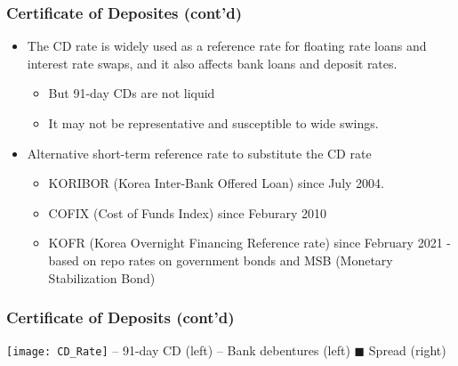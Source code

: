 \documentclass[10pt]{beamer}
\begin{document}
	\begin{frame}
		\frametitle{Certificate of Deposites (cont'd)}
		
		\begin{itemize}  \vspace{5pt} \itemsep10pt
			\item The CD rate is widely used as a reference rate for floating rate loans and interest rate swaps, and it also affects bank loans and deposit rates.
			\begin{itemize}  \vspace{5pt} \itemsep10pt
				\item But 91-day CDs are not liquid
				\item It may not be representative and susceptible to wide swings.
			\end{itemize}		
			
			\item Alternative short-term reference rate to substitute the CD rate
			\begin{itemize}  \vspace{5pt} \itemsep10pt
				\item KORIBOR (Korea Inter-Bank Offered Loan) since July 2004. 
				\item COFIX (Cost of Funds Index) since Feburary
				2010
				\item KOFR (Korea Overnight Financing Reference rate) since February 2021 - based on repo rates on government bonds and MSB (Monetary Stabilization Bond)
			\end{itemize} 	
		\end{itemize}		
		
		
	\end{frame}
	
	\begin{comment}
		\begin{frame}
			\frametitle{The LIBOR Scandals \scriptsize{pp. 34, BKM}} %
			\begin{center}
				\texttt{[image: LIBOR]}
			\end{center}
			
		\end{frame}
	\end{comment}
	
	
	
	\begin{frame}
		\frametitle{Certificate of Deposits (cont'd)} %
		\begin{center}
			\texttt{[image: CD\_Rate]}
			{\scriptsize \color{orange} -- 91-day CD (left)  \color{cyan} -- Bank debentures (left) \color{olive}  $\blacksquare$ Spread (right)}		
		\end{center}
		
	\end{frame}
	
\end{document}
